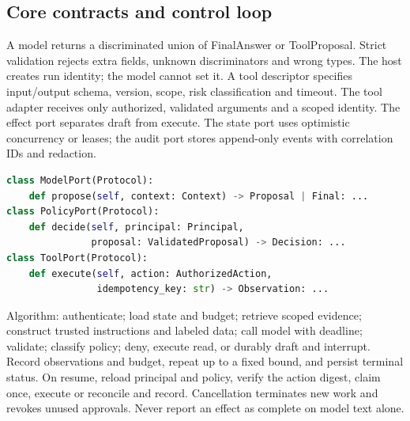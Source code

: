 \documentclass[11pt,letterpaper]{article}
\begin{document}
\subsection{Core contracts and control loop}
A model returns a discriminated union of FinalAnswer or ToolProposal. Strict validation rejects extra fields, unknown discriminators and wrong types. The host creates run identity; the model cannot set it. A tool descriptor specifies input/output schema, version, scope, risk classification and timeout. The tool adapter receives only authorized, validated arguments and a scoped identity. The effect port separates draft from execute. The state port uses optimistic concurrency or leases; the audit port stores append-only events with correlation IDs and redaction.
\begin{lstlisting}[language=Python]
class ModelPort(Protocol):
    def propose(self, context: Context) -> Proposal | Final: ...
class PolicyPort(Protocol):
    def decide(self, principal: Principal,
               proposal: ValidatedProposal) -> Decision: ...
class ToolPort(Protocol):
    def execute(self, action: AuthorizedAction,
                idempotency_key: str) -> Observation: ...
\end{lstlisting}
Algorithm: authenticate; load state and budget; retrieve scoped evidence; construct trusted instructions and labeled data; call model with deadline; validate; classify policy; deny, execute read, or durably draft and interrupt. Record observations and budget, repeat up to a fixed bound, and persist terminal status. On resume, reload principal and policy, verify the action digest, claim once, execute or reconcile and record. Cancellation terminates new work and revokes unused approvals. Never report an effect as complete on model text alone.
\end{document}
